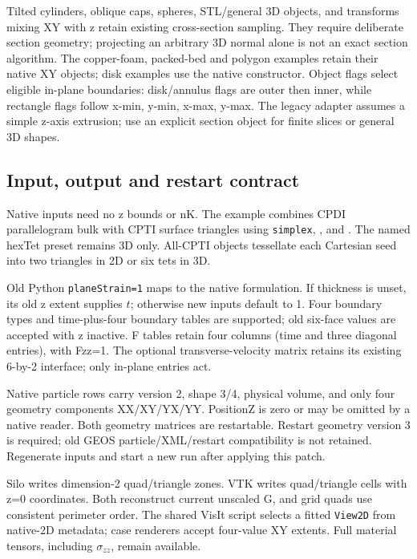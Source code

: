 Tilted cylinders, oblique caps, spheres, STL/general 3D objects, and transforms mixing XY with z retain existing cross-section sampling. They require deliberate section geometry; projecting an arbitrary 3D normal alone is not an exact section algorithm. The copper-foam, packed-bed and polygon examples retain their native XY objects; disk examples use the native constructor. Object flags select eligible in-plane boundaries: disk/annulus flags are outer then inner, while rectangle flags follow x-min, y-min, x-max, y-max. The legacy adapter assumes a simple z-axis extrusion; use an explicit section object for finite slices or general 3D shapes.

\subsection{Input, output and restart contract}
Native inputs need no z bounds or nK. The example
 combines CPDI parallelogram bulk with
CPTI surface triangles using \texttt{simplex},
, and .
The named hexTet preset remains 3D only. All-CPTI objects tessellate each
Cartesian seed into two triangles in 2D or six tets in 3D.

Old Python \texttt{planeStrain=1} maps to the native formulation. If thickness
is unset, its old z extent supplies $t$; otherwise new inputs default to 1.
Four boundary types and time-plus-four boundary tables are supported; old
six-face values are accepted with z inactive. F tables retain four columns
(time and three diagonal entries), with Fzz=1. The optional transverse-velocity
matrix retains its existing 6-by-2 interface; only in-plane entries act.

Native particle rows carry version 2, shape 3/4, physical volume, and only four
geometry components XX/XY/YX/YY. PositionZ is zero or may be omitted by a native
reader. Both geometry matrices are restartable. Restart geometry version 3 is
required; old GEOS particle/XML/restart compatibility is not retained.
Regenerate inputs and start a new run after applying this patch.

Silo writes dimension-2 quad/triangle zones. VTK writes quad/triangle cells with
z=0 coordinates. Both reconstruct current unscaled G, and grid quads use
consistent perimeter order. The shared VisIt script selects a fitted
\texttt{View2D} from native-2D metadata; case renderers accept four-value XY
extents. Full material tensors, including $\sigma_{zz}$, remain available.

